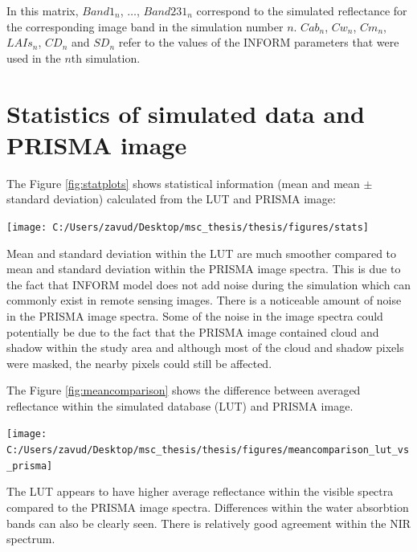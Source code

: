 \documentclass[a4paper, twoside]{templates/ociamthesis}
\let\origfigure\figure
\let\endorigfigure\endfigure
\renewenvironment{figure}[1][2] {
    \expandafter\origfigure\expandafter[H]
} {
    \endorigfigure
}
\begin{document}
In this matrix, \(Band1_{n}\), \(\dots\), \(Band231_{n}\) correspond to the simulated reflectance for the corresponding image band in the simulation number \(n\). \(Cab_{n}\), \(Cw_{n}\), \(Cm_{n}\), \(LAIs_{n}\), \(CD_{n}\) and \(SD_{n}\) refer to the values of the INFORM parameters that were used in the \(n\)th simulation.

\hypertarget{statistics-of-simulated-data-and-prisma-image-1}{%
\section{Statistics of simulated data and PRISMA image}\label{statistics-of-simulated-data-and-prisma-image-1}}

The Figure \ref{fig:statplots} shows statistical information (mean and mean \(\pm\) standard deviation) calculated from the LUT and PRISMA image:

\begin{figure}
\texttt{[image: C:/Users/zavud/Desktop/msc\_thesis/thesis/figures/stats]} \caption{Mean and mean $\pm$ standard deviation in the a) LUT and b) PRISMA image}\label{fig:statplots}
\end{figure}

Mean and standard deviation within the LUT are much smoother compared to mean and standard deviation within the PRISMA image spectra. This is due to the fact that INFORM model does not add noise during the simulation which can commonly exist in remote sensing images. There is a noticeable amount of noise in the PRISMA image spectra. Some of the noise in the image spectra could potentially be due to the fact that the PRISMA image contained cloud and shadow within the study area and although most of the cloud and shadow pixels were masked, the nearby pixels could still be affected.

The Figure \ref{fig:meancomparison} shows the difference between averaged reflectance within the simulated database (LUT) and PRISMA image.

\begin{figure}

{\centering \texttt{[image: C:/Users/zavud/Desktop/msc\_thesis/thesis/figures/meancomparison\_lut\_vs\_prisma]} 

}

\caption{Difference between averaged LUT and PRISMA image reflectance}\label{fig:meancomparison}
\end{figure}

The LUT appears to have higher average reflectance within the visible spectra compared to the PRISMA image spectra. Differences within the water absorbtion bands can also be clearly seen. There is relatively good agreement within the NIR spectrum.
\end{document}
